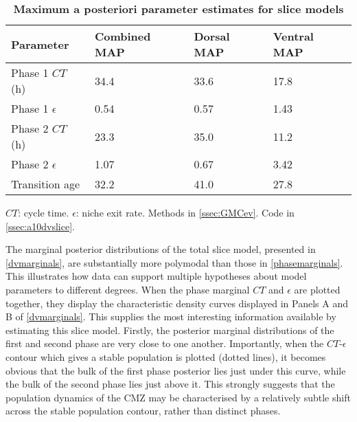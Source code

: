 \begin{table}[!ht]
    \centering
    \caption{{\bf Maximum a posteriori parameter estimates for slice models}}
    \begin{tabular}{|l|l|l|l|}
        \hline
        {\bf Parameter} & {\bf Combined MAP} & {\bf Dorsal MAP} & {\bf Ventral MAP}\\ \hline
        Phase 1 $CT$ (h) & 34.4 & 33.6 & 17.8\\ \hline
        Phase 1 $\epsilon$ & 0.54 & 0.57 & 1.43\\ \hline
        Phase 2 $CT$ (h) & 23.3 & 35.0 & 11.2\\ \hline
        Phase 2 $\epsilon$ & 1.07 & 0.67 & 3.42\\ \hline
        Transition age & 32.2 & 41.0 & 27.8\\ \hline
        \end{tabular}
    \begin{flushleft}
        $CT$: cycle time.
        $\epsilon$: niche exit rate.
        Methods in \autoref{ssec:GMCev}.
        Code in \autoref{ssec:a10dvslice}.    
    \end{flushleft}
    \label{dvMAPtable}
\end{table}

The marginal posterior distributions of the total slice model, presented in \autoref{dvmarginals}, are substantially more polymodal than those in \autoref{phasemarginals}. This illustrates how data can support multiple hypotheses about model parameters to different degrees. When the phase marginal $CT$ and $\epsilon$ are plotted together, they display the characteristic density curves displayed in Panels A and B of \autoref{dvmarginals}. This supplies the most interesting information available by estimating this slice model. Firstly, the posterior marginal distributions of the first and second phase are very close to one another. Importantly, when the $CT$-$\epsilon$ contour which gives a stable population is plotted (dotted lines), it becomes obvious that the bulk of the first phase posterior lies just under this curve, while the bulk of the second phase lies just above it. This strongly suggests that the population dynamics of the CMZ may be characterised by a relatively subtle shift across the stable population contour, rather than distinct phases.

